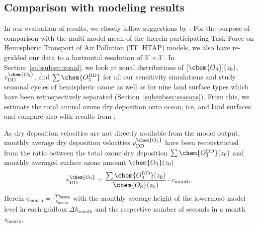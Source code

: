 \documentclass[gmd, manuscript]{copernicus}
\begin{document}
\subsection{Comparison with modeling results}
\label{subsec:model}
%
In our evaluation of results, we closely follow suggestions by \citet{ACP:Hardacre2015}. For the purpose of comparison with the multi-model mean of the therein participating Task Force on Hemispheric Transport of Air Pollution (TF~HTAP) models, we also have re-gridded our data to a horizontal resolution of $3^\circ\times 3^\circ$. In Section~\ref{subsubsec:zonal}, we look at zonal distributions of $[\chem{O_3}](z_0)$, $v^\chem{O_3}_\text{DD}$, and $\sum\chem{O_3^\text{DD}}$ for all our sensitivity simulations and study seasonal cycles of hemispheric ozone as well as for nine land surface types which have been retrospectively separated (Section~\ref{subsubsec:seasons}). From this, we estimate the total annual ozone dry deposition onto ocean, ice, and land surfaces and compare also with results from \citet{ACP:Luhar2017}.

As dry deposition velocities are not directly available from the model output, monthly average dry deposition velocities $v^\chem{O_3}_\text{DD}$ have been reconstructed from the ratio between the total ozone dry deposition $\sum \chem{O_3^\text{DD}}(z_0)$ and monthly averaged surface ozone amount $\chem{O_3}(z_0)$ 
\begin{equation}
  v^\chem{O_3}_\text{DD} = \frac{\sum \chem{O_3^\text{DD}}(z_0)}{\chem{O_3}(z_0)}\cdot c_\text{month}.
\end{equation}
Herein $c_\text{month} = \frac{\Delta h_\text{month}}{s_\text{month}}$ with the monthly average height of the lowermost model level in each gridbox $\Delta h_\text{month}$ and the respective number of seconds in a month $s_\text{month}$.
%
\end{document}
